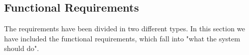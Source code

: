 	\subsection{Functional Requirements}
	The requirements have been divided in two different types. In this section we have included the functional requirements, which fall into "what the system should do".


	\vspace{1cm}
	
                                                                                  

